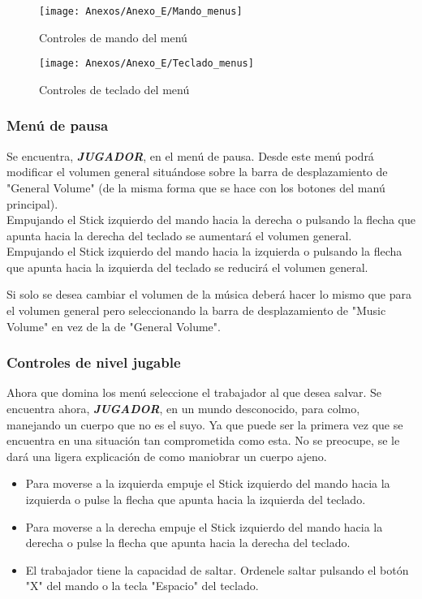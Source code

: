 \begin{figure}[h]
\centering
\texttt{[image: Anexos/Anexo\_E/Mando\_menus]}
\caption{Controles de mando del menú}
\end{figure}

\begin{figure}[h]
\centering
\texttt{[image: Anexos/Anexo\_E/Teclado\_menus]}
\caption{Controles de teclado del menú}
\end{figure}

\subsubsection{Menú de pausa}
Se encuentra, \textit{\textbf{JUGADOR}}, en el menú de pausa. Desde este menú podrá modificar el volumen general situándose sobre la barra de desplazamiento de "General Volume" (de la misma forma que se hace con los botones del manú principal).\\
Empujando el Stick izquierdo del mando hacia la derecha o pulsando la flecha que apunta hacia la derecha del teclado se aumentará el volumen general.\\
Empujando el Stick izquierdo del mando hacia la izquierda o pulsando la flecha que apunta hacia la izquierda del teclado se reducirá el volumen general.

Si solo se desea cambiar el volumen de la música deberá hacer lo mismo que para el volumen general pero seleccionando la barra de desplazamiento de "Music Volume" en vez de la de "General Volume".

\subsubsection{Controles de nivel jugable}
Ahora que domina los menú seleccione el \textcolor{azulWorker}{trabajador} al que desea salvar. Se encuentra ahora, \textit{\textbf{JUGADOR}}, en un \textcolor{endeavour}{mundo desconocido}, para colmo, manejando un cuerpo que no es el suyo. Ya que puede ser la primera vez que se encuentra en una situación tan comprometida como esta. No se preocupe, se le dará una ligera explicación de como maniobrar un cuerpo ajeno.
\begin{itemize}
\item
Para moverse a la izquierda empuje el Stick izquierdo del mando hacia la izquierda o pulse la flecha que apunta hacia la izquierda del teclado.
\item
Para moverse a la derecha empuje el Stick izquierdo del mando hacia la derecha o pulse la flecha que apunta hacia la derecha del teclado.
\item
El \textcolor{azulWorker}{trabajador} tiene la capacidad de saltar. Ordenele saltar pulsando el botón "X" del mando o la tecla "Espacio" del teclado.
\end{itemize}

